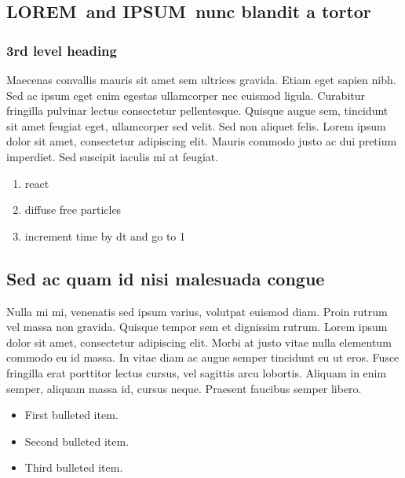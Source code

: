 \documentclass[
  10pt,
  letterpaper,
]{article}
\begin{document}
\hypertarget{lorem-and-ipsum-nunc-blandit-a-tortor}{%
\subsection{\texorpdfstring{\textbf{LOREM}~and \textbf{IPSUM}~nunc
blandit a
tortor}{LOREM~and IPSUM~nunc blandit a tortor}}\label{lorem-and-ipsum-nunc-blandit-a-tortor}}

\hypertarget{rd-level-heading}{%
\subsubsection{3rd level heading}\label{rd-level-heading}}

Maecenas convallis mauris sit amet sem ultrices gravida. Etiam eget
sapien nibh. Sed ac ipsum eget enim egestas ullamcorper nec euismod
ligula. Curabitur fringilla pulvinar lectus consectetur pellentesque.
Quisque augue sem, tincidunt sit amet feugiat eget, ullamcorper sed
velit. Sed non aliquet felis. Lorem ipsum dolor sit amet, consectetur
adipiscing elit. Mauris commodo justo ac dui pretium imperdiet. Sed
suscipit iaculis mi at feugiat.

\begin{enumerate}
\def\labelenumi{\arabic{enumi}.}
\item
  react
\item
  diffuse free particles
\item
  increment time by dt and go to 1
\end{enumerate}

\hypertarget{sed-ac-quam-id-nisi-malesuada-congue}{%
\subsection{Sed ac quam id nisi malesuada
congue}\label{sed-ac-quam-id-nisi-malesuada-congue}}

Nulla mi mi, venenatis sed ipsum varius, volutpat euismod diam. Proin
rutrum vel massa non gravida. Quisque tempor sem et dignissim rutrum.
Lorem ipsum dolor sit amet, consectetur adipiscing elit. Morbi at justo
vitae nulla elementum commodo eu id massa. In vitae diam ac augue semper
tincidunt eu ut eros. Fusce fringilla erat porttitor lectus cursus, vel
sagittis arcu lobortis. Aliquam in enim semper, aliquam massa id, cursus
neque. Praesent faucibus semper libero.

\begin{itemize}
\item
  First bulleted item.
\item
  Second bulleted item.
\item
  Third bulleted item.
\end{itemize}
\end{document}
